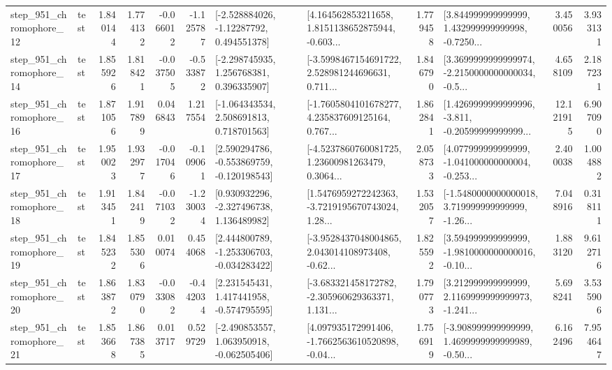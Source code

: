 \begin{tabular}{llrrrrllrlrr}
  step\_951\_chromophore\_12 &      test &      1.840144 &    1.774132 &     -0.066012 & -1.125787 &    [-2.528884026, -1.12287792, 0.494551378] &  [4.164562853211658, 1.8151138652875944, -0.603... &       1.779458 &  [3.844999999999999, 1.432999999999998, -0.7250... &            3.450056 &          3.933131 \\
  step\_951\_chromophore\_14 &      test &      1.855926 &    1.818421 &     -0.037505 & -0.533872 &    [-2.298745935, 1.256768381, 0.396335907] &  [-3.5998467154691722, 2.528981244696631, 0.711... &       1.846790 &  [3.3699999999999974, -2.2150000000000034, -0.5... &            4.658109 &          2.187231 \\
  step\_951\_chromophore\_16 &      test &      1.871056 &    1.917899 &      0.046843 &  1.217554 &    [-1.064343534, 2.508691813, 0.718701563] &  [-1.7605804101678277, 4.235837609125164, 0.767... &       1.862841 &  [1.4269999999999996, -3.811, -0.20599999999999... &           12.121915 &          6.907090 \\
  step\_951\_chromophore\_17 &      test &      1.950023 &    1.932977 &     -0.017046 & -0.109061 &   [2.590294786, -0.553869759, -0.120198543] &  [-4.5237860760081725, 1.23600981263479, 0.3064... &       2.058733 &  [4.077999999999999, -1.041000000000004, -0.253... &            2.400038 &          1.004882 \\
  step\_951\_chromophore\_18 &      test &      1.913451 &    1.842419 &     -0.071032 & -1.230034 &    [0.930932296, -2.327496738, 1.136489982] &  [1.5476959272242363, -3.7219195670743024, 1.28... &       1.532057 &  [-1.5480000000000018, 3.719999999999999, -1.26... &            7.048916 &          0.318111 \\
  step\_951\_chromophore\_19 &      test &      1.845232 &    1.855306 &      0.010074 &  0.454068 &   [2.444800789, -1.253306703, -0.034283422] &  [-3.9528437048004865, 2.043014108973408, -0.62... &       1.825592 &  [3.594999999999999, -1.9810000000000016, -0.10... &            1.883120 &          9.612716 \\
  step\_951\_chromophore\_20 &      test &      1.863872 &    1.830790 &     -0.033082 & -0.442034 &    [2.231545431, 1.417441958, -0.574795595] &  [-3.683321458172782, -2.305960629363371, 1.131... &       1.790773 &  [3.212999999999999, 2.1169999999999973, -1.241... &            5.698241 &          3.535906 \\
  step\_951\_chromophore\_21 &      test &      1.853668 &    1.867385 &      0.013717 &  0.529729 &   [-2.490853557, 1.063950918, -0.062505406] &  [4.097935172991406, -1.7662563610520898, -0.04... &       1.756919 &  [-3.908999999999999, 1.4699999999999989, -0.50... &            6.162496 &          7.954647 \\

\end{tabular}
